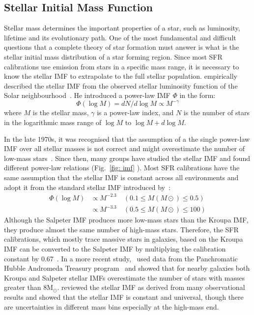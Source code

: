 \subsection{Stellar Initial Mass Function}
\label{sec: imf}
Stellar mass determines the important properties of a star, such as luminosity, lifetime and its evolutionary path. 
One of the most fundamental and difficult questions that a complete theory of star formation must answer is what is the stellar initial mass distribution of a star forming region.
Since most SFR calibrations use emission from stars in a specific mass range, it is necessary to know the stellar IMF to extrapolate to the full stellar population.
\cite{Salpeter55} empirically described the stellar IMF from the observed stellar luminosity function of the Solar neighbourhood~\citep{Shu87}. 
He introduced a power-law IMF $\Phi$  in the form:
\begin{equation}
\label{equ: salp}
\Phi (\log M) = dN / d \log M \propto M^{-\gamma }
\end{equation} 
where $M$ is the stellar mass, $\gamma$ is a power-law index, and $N$ is the number of stars in the logarithmic mass range of $\log M$ to $\log M + d\log M$. 

In the late 1970s, it was recognised that the assumption of a the single power-law IMF over all stellar masses is not correct and might overestimate the number of low-mass stars~\citep{Kroupa93, Bastin10}. 
Since then, many groups have studied the stellar IMF and found different power-law relations (Fig.~\ref{fig: imf} ). 
Most SFR calibrations have the same assumption that the stellar IMF is constant across all environments and adopt it from the standard stellar IMF introduced by\ \cite{Kroupa01}:
\begin{equation}
\begin{split}
    \Phi (\log M) & \propto M^{-2.3}    \quad    (0.1 \le M(M{\odot}) \le 0.5)\\                  
           & \propto M^{-3.3}    \quad    (0.5 \le M(M{\odot}) \le 100)
\end{split}
\end{equation}
Although the Salpeter IMF produces more low-mass stars than the Kroupa IMF, they produce almost the same number of high-mass stars. 
Therefore, the SFR calibrations, which mostly trace massive stars in galaxies, based on the Kroupa IMF can be converted to the Salpeter IMF by multiplying the calibration constant by 0.67~\citep{Madau14}.
In a more recent study,~\cite{Weisz15} used data from the Panchromatic Hubble Andromeda Treasury program~\citep[PHAT][]{Dalcanton12} and showed that for nearby galaxies both Kroupa and Salpeter stellar IMFs overestimate the number of stars with masses greater than 8M$_\odot$.
\cite{Bastin10} reviewed the stellar IMF as derived from many observational results and showed that the stellar IMF is constant and universal, though there are uncertainties in different mass bins especially at the high-mass end. 

